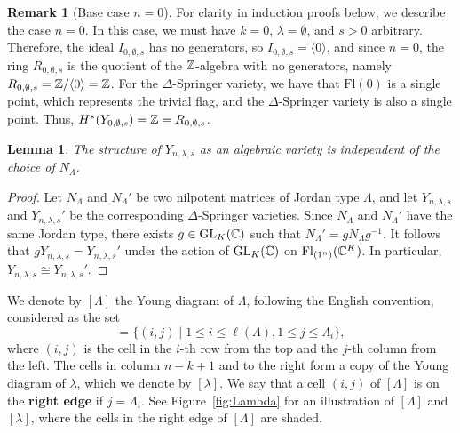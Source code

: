 \documentclass[11pt]{amsart}
\newtheorem{lemma}[theorem]{Lemma}     %
\theoremstyle{definition}
\newtheorem{remark}[theorem]{Remark}
\newcommand{\Fl}{\mathrm{Fl}}
\newcommand{\GL}{\mathrm{GL}}
\newcommand{\la}{\lambda}
\begin{document}
\begin{remark}[Base case $n=0$]\label{rmk:BaseCase}
For clarity in induction proofs below, we describe the case $n=0$. In this case, we must have $k=0$, $\lambda = \emptyset$, and $s>0$ arbitrary. Therefore, the ideal $I_{0,\emptyset,s}$ has no generators, so $I_{0,\emptyset,s}=\langle 0\rangle$, and since $n=0$, the ring $R_{0,\emptyset,s}$ is the quotient of the $\mathbb{Z}$-algebra with no generators, namely $R_{0,\emptyset,s} = \mathbb{Z}/\langle 0\rangle = \mathbb{Z}$. For the $\Delta$-Springer variety, we have that $\Fl(0)$ is a single point, which represents the trivial flag, and the $\Delta$-Springer variety is also a single point. Thus, $H^*(Y_{0,\emptyset,s}) = \mathbb{Z} = R_{0,\emptyset,s}$.
\end{remark}


\begin{lemma}
\label{lem:ConjInd}
  The structure of $Y_{n,\la,s}$ as an algebraic variety is independent of the choice of $N_\Lambda$.
\end{lemma}

\begin{proof}
Let $N_\Lambda$ and $N_\Lambda'$ be two nilpotent matrices of Jordan type $\Lambda$, and let $Y_{n,\la, s}$ and $Y_{n, \la,s}'$ be the corresponding $\Delta$-Springer varieties. Since $N_\Lambda$ and $N_{\Lambda}'$ have the same Jordan type, there exists $g\in \GL_K(\bC)$ such that $N_\Lambda' = gN_\Lambda g^{-1}$. It follows that $g Y_{n,\lambda, s} = Y_{n,\lambda, s}'$ under the action of $\GL_K(\bC)$ on $\Fl_{(1^n)}(\bC^K)$.  In particular, $Y_{n, \la, s} \cong Y_{n, \la, s}'$.
\end{proof}







We denote by $[\Lambda]$ the Young diagram of $\Lambda$, following the English convention, considered as the set
\begin{equation}
[\Lambda]=\{(i,j)\mid 1\leq i\leq \ell(\Lambda), 1\leq j\leq \Lambda_i\},
\end{equation}
where $(i,j)$ is the cell in the $i$-th row from the top and the $j$-th column from the left.
The cells in column $n-k+1$ and to the right form a copy of the Young diagram of $\lambda$, which we denote by $[\lambda]$. 
We say that a cell $(i,j)$ of $[\Lambda]$ is on the \textbf{right edge} if $j=\Lambda_i$.
See Figure~\ref{fig:Lambda} for an illustration of $[\Lambda]$ and $[\lambda]$, where the cells in the right edge of $[\Lambda]$ are shaded. 
\end{document}
